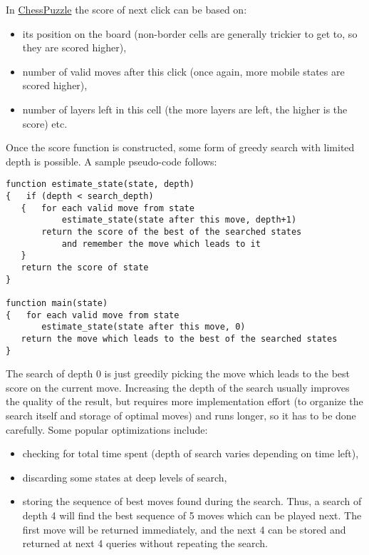 In
\href{http://www.topcoder.com/longcontest/?module=ViewProblemStatement\&rd=14196\&pm=10728}{ChessPuzzle}
the score of next click can be based on:

\begin{itemize}
\item
  its position on the board (non-border cells are generally trickier to
  get to, so they are scored higher),
\item
  number of valid moves after this click (once again, more mobile states
  are scored higher),
\item
  number of layers left in this cell (the more layers are left, the
  higher is the score) etc.
\end{itemize}

Once the score function is constructed, some form of greedy search with
limited depth is possible. A sample pseudo-code follows:

\begin{verbatim}
function estimate_state(state, depth)
{   if (depth < search_depth)
   {   for each valid move from state
           estimate_state(state after this move, depth+1)
       return the score of the best of the searched states
           and remember the move which leads to it
   }
   return the score of state
}
 
function main(state)
{   for each valid move from state
       estimate_state(state after this move, 0)
   return the move which leads to the best of the searched states
}
\end{verbatim}

The search of depth 0 is just greedily picking the move which leads to
the best score on the current move. Increasing the depth of the search
usually improves the quality of the result, but requires more
implementation effort (to organize the search itself and storage of
optimal moves) and runs longer, so it has to be done carefully. Some
popular optimizations include:

\begin{itemize}
\item
  checking for total time spent (depth of search varies depending on
  time left),
\item
  discarding some states at deep levels of search,
\item
  storing the sequence of best moves found during the search. Thus, a
  search of depth 4 will find the best sequence of 5 moves which can be
  played next. The first move will be returned immediately, and the next
  4 can be stored and returned at next 4 queries without repeating the
  search.
\end{itemize}

